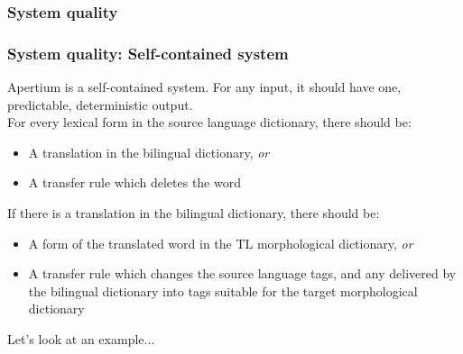 \documentclass[10pt,xetex]{beamer} %
\begin{document}
\begin{frame}
  \frametitle{System quality}

\end{frame}

\begin{frame}
  \frametitle{System quality: Self-contained system}

Apertium is a self-contained system. For any input, it should have one, predictable, deterministic output. \\

For every lexical form in the source language dictionary, there should be:

\begin{itemize}
  \item A translation in the bilingual dictionary, {\em or} 
  \item A transfer rule which deletes the word
\end{itemize}

If there is a translation in the bilingual dictionary, there should be:

\begin{itemize}
  \item A form of the translated word in the TL morphological dictionary, {\em or}
  \item A transfer rule which changes the source language tags, and any delivered by 
    the bilingual dictionary into tags suitable for the target morphological dictionary
\end{itemize}

Let's look at an example...

\end{frame}
\end{document}

